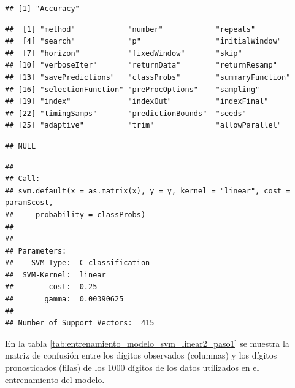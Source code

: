 \documentclass[12pt,spanish,a4paper]{article}
\newenvironment{Shaded}{\begin{snugshade}}{\end{snugshade}}
\newcommand{\KeywordTok}[1]{\textcolor[rgb]{0.13,0.29,0.53}{\textbf{#1}}}
\newcommand{\NormalTok}[1]{#1}
\newcommand{\OperatorTok}[1]{\textcolor[rgb]{0.81,0.36,0.00}{\textbf{#1}}}
\numberwithin{equation}{section}
\begin{document}
\begin{verbatim}
## [1] "Accuracy"
\end{verbatim}

\begin{Shaded}
\end{Shaded}

\begin{verbatim}
##  [1] "method"            "number"            "repeats"          
##  [4] "search"            "p"                 "initialWindow"    
##  [7] "horizon"           "fixedWindow"       "skip"             
## [10] "verboseIter"       "returnData"        "returnResamp"     
## [13] "savePredictions"   "classProbs"        "summaryFunction"  
## [16] "selectionFunction" "preProcOptions"    "sampling"         
## [19] "index"             "indexOut"          "indexFinal"       
## [22] "timingSamps"       "predictionBounds"  "seeds"            
## [25] "adaptive"          "trim"              "allowParallel"
\end{verbatim}

\begin{Shaded}
\end{Shaded}

\begin{verbatim}
## NULL
\end{verbatim}

\begin{Shaded}
\end{Shaded}

\begin{verbatim}
## 
## Call:
## svm.default(x = as.matrix(x), y = y, kernel = "linear", cost = param$cost, 
##     probability = classProbs)
## 
## 
## Parameters:
##    SVM-Type:  C-classification 
##  SVM-Kernel:  linear 
##        cost:  0.25 
##       gamma:  0.00390625 
## 
## Number of Support Vectors:  415
\end{verbatim}

En la tabla \ref{tab:entrenamiento_modelo_svm_linear2_paso1} se muestra
la matriz de confusión entre los dígitos observados (columnas) y los
dígitos pronosticados (filas) de los 1000 dígitos de los datos
utilizados en el entrenamiento del modelo.
\end{document}
